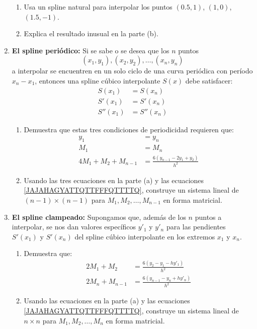 \begin{enumerate}
\begin{enumerate}
        \item Usa un spline natural para interpolar los puntos $(0.5, 1)$, $(1, 0)$, $(1.5, -1)$.
        \item Explica el resultado inusual en la parte (b).
    \end{enumerate}
    \item \textbf{El spline periódico:} Si se sabe o se desea que los $n$ puntos
    $$(x_1, y_1), (x_2, y_2), \dots, (x_n, y_n)$$
    a interpolar se encuentren en un solo ciclo de una curva periódica con período $x_n - x_1$, entonces una spline cúbico interpolante $S(x)$ debe satisfacer:
    \begin{align*}
        S(x_1) & = S(x_n) \\
        S'(x_1) & = S'(x_n) \\
        S''(x_1) & = S''(x_n)
    \end{align*}
    \begin{enumerate}
        \item Demuestra que estas tres condiciones de periodicidad requieren que:
        \begin{align*}
            y_1 & = y_n \\
            M_1 & = M_n \\
            4M_1 + M_2 + M_{n-1} & = \frac{6(y_{n-1} - 2y_1 + y_2)}{h^2}
        \end{align*}
        \item Usando las tres ecuaciones en la parte (a) y las ecuaciones \eqref{JAJAHAGYATTQTTFFFQTTTTQ}, construye un sistema lineal de $(n - 1) \times (n - 1)$ para $M_1, M_2, \ldots, M_{n-1}$ en forma matricial.
    \end{enumerate}
    \item \textbf{El spline clampeado:} Supongamos que, además de los $n$ puntos a interpolar, se nos dan valores específicos $y'_1$ y $y'_n$ para las pendientes $S'(x_1)$ y $S'(x_n)$ del spline cúbico interpolante en los extremos $x_1$ y $x_n$.
    \newpage
    \begin{enumerate}
        \item Demuestra que:
        \begin{align*}
            2M_1 + M_2 & = \frac{6(y_2 - y_1 - h y'_1)}{h^2} \\
            2M_n + M_{n-1} & = \frac{6(y_{n-1} - y_n + h y'_n)}{h^2}
        \end{align*}
        \item Usando las ecuaciones en la parte (a) y las ecuaciones \eqref{JAJAHAGYATTQTTFFFQTTTTQ}, construye un sistema lineal de $n \times n$ para $M_1, M_2, \dots, M_n$ en forma matricial.
    \end{enumerate}
\end{enumerate}
